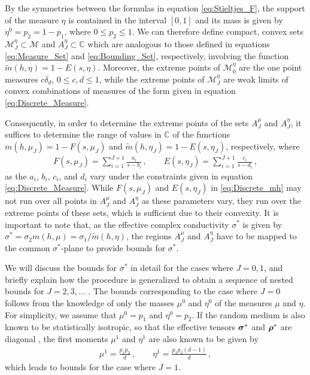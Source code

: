 \documentclass{cmslatex}
\newcommand\bsig{\mbox{\boldmath${\sigma}$}}
\newcommand\brho{\mbox{\boldmath${\rho}$}}
\begin{document}
By the symmetries between the formulas in equation
\eqref{eq:Stieltjes_F}, the support of the measure $\eta$ is contained in
the interval $[0,1]$ and its mass is given by $\eta^0=p_2=1-p_1$, where
$0\leq p_2\leq1$. We can therefore define compact, convex sets
$\mathscr{M}_J^\eta\subset\mathscr{M}$ and $A_J^\eta\subset\mathbb{C}$ which are
analogous to those defined in equations \eqref{eq:Measure_Set} and
\eqref{eq:Bounding_Set}, respectively, involving the function
$\tilde{m}(h,\eta)=1-E(s,\eta)$. Moreover, the extreme points of
$\mathscr{M}_0^\eta$ are the one point measures $c\delta_d$, $0\leq c,d\leq1$, 
while the extreme points of $\mathscr{M}_J^\eta$ are weak limits
of convex combinations of measures of the form given in equation
\eqref{eq:Discrete_Measure}. 



Consequently, in order to determine the extreme
points of the sets $A_J^\mu$ and $A_J^\eta$, it suffices to determine the
range of values in $\mathbb{C}$ of the functions $m(h,\mu_J)=1-F(s,\mu_J)$
and $\tilde{m}(h,\eta_J)=1-E(s,\eta_J)$, respectively, where  
%
\begin{align}\label{eq:Discrete_mh}
  F(s,\mu_J)=\sum_{i=1}^{J+1}\frac{a_i}{s-b_i}\,, \qquad
  E(s,\eta_J)=\sum_{i=1}^{J+1}\frac{c_i}{s-d_i}\,,
\end{align}
as the $a_i$, $b_i$, $c_i$, and $d_i$ vary under the
constraints given in equation  \eqref{eq:Discrete_Measure}. While
$F(s,\mu_J)$ and $E(s,\eta_J)$ in 
\eqref{eq:Discrete_mh} may not run over all points in $A_J^\mu$ and
$A_J^\eta$ as these parameters vary, they run over the
extreme points of these sets, which is sufficient due to their
convexity. It is important to note that, as the effective complex
conductivity $\sigma^*$ is given by $\sigma^*=\sigma_2m(h,\mu)=\sigma_1/\tilde{m}(h,\eta)$, the
regions $A_J^\mu$ and $A_J^\eta$ have to be mapped to the common
$\sigma^*$-plane to provide bounds for $\sigma^*$.    





We will discuss the bounds for $\sigma^*$ in detail for the cases where
$J=0,1$, and briefly explain how the procedure is generalized to
obtain a sequence of nested bounds for $J=2,3,\ldots$
\cite{Golden:JMPS-333}. The bounds corresponding to the case where $J=0$
follows from the knowledge of only the masses $\mu^0$ and $\eta^0$ of the
measures $\mu$ and $\eta$. For simplicity, we assume that $\mu^0=p_1$ and
$\eta^0=p_2$. If the random medium is also known to be statistically
isotropic, so that the effective tensors $\bsig^*$ and $\brho^*$ are
diagonal \cite{MILTON:2002:TC}, the first moments $\mu^1$ and $\eta^1$ are
also known to be given by \cite{Golden:JMPS-333}    
%
\begin{align}\label{eq:First_Moments}
  \mu^1=\frac{p_1p_2}{d}\,, \qquad
  \eta^1=\frac{p_1p_2(d-1)}{d}\,,
\end{align}
%
which leads to bounds for the case where $J=1$.
\end{document}
